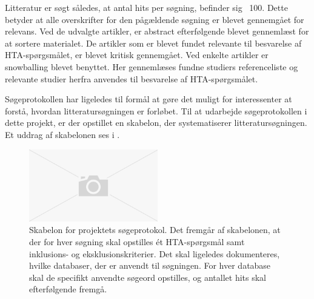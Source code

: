 Litteratur er søgt således, at antal hits per søgning, befinder sig ~100. Dette betyder at alle overskrifter for den pågældende søgning er blevet gennemgået for relevans. Ved de udvalgte artikler, er abstract efterfølgende blevet gennemlæst for at sortere materialet. De artikler som er blevet fundet relevante til besvarelse af HTA-spørgsmålet, er blevet kritisk gennemgået. Ved enkelte artikler er snowballing blevet benyttet. Her gennemlæses fundne studiers referenceliste og relevante studier herfra anvendes til besvarelse af HTA-spørgsmålet.


Søgeprotokollen har ligeledes til formål at gøre det muligt for interessenter at forstå, hvordan litteratursøgningen er forløbet. \citep{metodehaandbogen} Til at udarbejde søgeprotokollen i dette projekt, er der opstillet en skabelon, der systematiserer litteratursøgningen. Et uddrag af skabelonen ses i .


\begin{figure}[H]
\begin{center}
\includegraphics[width=0.5\textwidth]{figures/cMetode/soegeprotokol}
\end{center}
\caption{Skabelon for projektets søgeprotokol. Det fremgår af skabelonen, at der for hver søgning skal opstilles ét HTA-spørgsmål samt inklusions- og eksklusionskriterier. Det skal ligeledes dokumenteres, hvilke databaser, der er anvendt til søgningen. For hver database skal de specifikt anvendte søgeord opstilles, og antallet hits skal efterfølgende fremgå.}
\label{fig:soegeprotokol} 
\end{figure}


